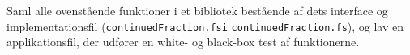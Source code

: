 Saml alle ovenstående funktioner i et bibliotek bestående af dets
interface og implementationsfil
(\lstinline[language=console]{continuedFraction.fsi}
\lstinline[language=console]{continuedFraction.fs}), og lav en
applikationsfil, der udfører en white- og black-box test af
funktionerne.
